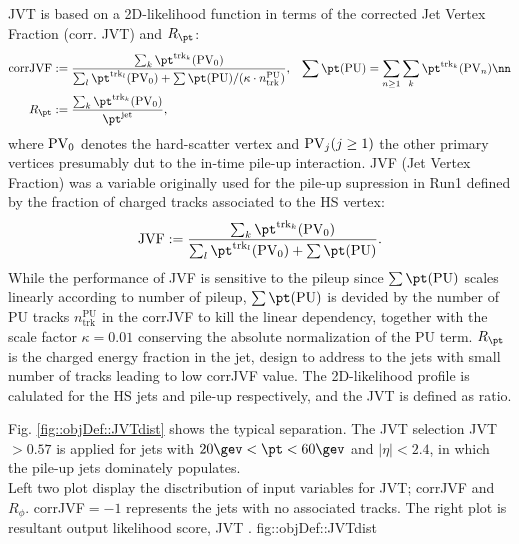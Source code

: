 JVT is based on a 2D-likelihood function in terms of the corrected Jet Vertex Fraction (corr. JVT) and $R_{\pt}$:
\begin{align}
\mathrm{corrJVF} & := \frac{ \sum_k \pttk (\pv_0)  }{\sum_l \pttl (\pv_0) + \sum\pt(\mathrm{PU})/ (\kappa \cdot n_{\mathrm{trk}}^{\mathrm{PU}} )  }
,  \,\,\,\,\,  \sum\pt(\mathrm{PU}) = \sum_{n \ge 1} \sum_k  \pttk (\pv_n)  \nn \\
R_{\pt} & := \frac{\sum_k \pttk (\pv_0) }{\pt^{\mathrm{jet}}},
\end{align}
where $\mathrm{PV}_0$ denotes the hard-scatter vertex and  $\mathrm{PV}_j (j \ge 1)$ the other primary vertices presumably dut to the in-time pile-up interaction. 
JVF (Jet Vertex Fraction) was a variable originally used for the pile-up supression in Run1 \cite{JVF} defined by the fraction of charged tracks associated to the HS vertex:
\begin{align}
\mathrm{JVF} := \frac{ \sum_k \pttk (\pv_0)  }{ \sum_l \pttl (\pv_0) + \sum\pt(\mathrm{PU}) }.
\end{align}
While the performance of JVF is sensitive to the pileup since $\sum\pt(\mathrm{PU})$ scales linearly according to number of pileup, $\sum\pt(\mathrm{PU})$ is devided by the number of PU tracks $n_{\mathrm{trk}}^{\mathrm{PU}}$ in the corrJVF to kill the linear dependency, together with the scale factor $\kappa=0.01$ conserving the absolute normalization of the PU term.
$R_{\pt}$ is the charged energy fraction in the jet, design to address to the jets with small number of tracks leading to low corrJVF value.
The 2D-likelihood profile is calulated for the HS jets and pile-up respectively, and the JVT is defined as ratio.

Fig. \ref{fig::objDef::JVTdist} shows the typical separation.
The JVT selection JVT$>0.57$ is applied for jets with $20 \gev < \pt< 60\gev$ and $|\eta|<2.4$, in which the pile-up jets dominately populates.  \\


%

{Left two plot display the disctribution of input variables for JVT; corrJVF and $R_\phi$. corrJVF$=-1$ represents the jets with no associated tracks. The right plot is resultant output likelihood score,  JVT  \cite{155_JVT}.
}
{fig::objDef::JVTdist}




